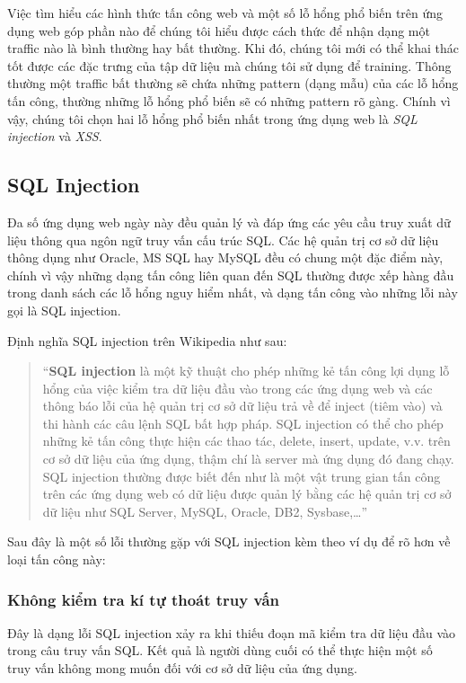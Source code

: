 \documentclass[../main-report.tex]{subfiles}
\begin{document}
Việc tìm hiểu các hình thức tấn công web và một số lỗ hổng phổ biến trên ứng dụng web góp phần nào để chúng tôi hiểu được cách thức để nhận dạng một traffic nào là bình thường hay bất thường. Khi đó, chúng tôi mới có thể khai thác tốt được các đặc trưng của tập dữ liệu mà chúng tôi sử dụng để training. Thông thường một traffic bất thường sẽ chứa những pattern (dạng mẫu) của các lỗ hổng tấn công, thường những lỗ hổng phổ biến sẽ có những pattern rõ gàng. Chính vì vậy, chúng tôi chọn hai lỗ hổng phổ biến nhất trong ứng dụng web là \emph{SQL injection} và \emph{XSS}.
\subsection{SQL Injection}
Đa số ứng dụng web ngày này đều quản lý và đáp ứng các yêu cầu truy xuất dữ liệu
thông qua ngôn ngữ truy vấn cấu trúc SQL. Các hệ quản trị cơ sở dữ liệu thông dụng
như Oracle, MS SQL hay MySQL đều có chung một đặc điểm này, chính vì vậy những
dạng tấn công liên quan đến SQL thường được xếp hàng đầu trong danh sách các lỗ hổng nguy hiểm nhất, và dạng tấn công vào những lỗi này gọi là SQL injection.

Định nghĩa SQL injection trên Wikipedia như sau:

\begin{quote}
``\textbf{SQL injection} là một kỹ thuật cho phép những kẻ tấn công lợi dụng lỗ hổng của việc kiểm tra dữ liệu đầu vào trong các ứng dụng web và các thông báo lỗi của hệ quản trị cơ sở dữ liệu trả về để inject (tiêm vào) và thi hành các câu lệnh SQL bất hợp pháp. SQL injection có thể cho phép những kẻ tấn công thực hiện các thao tác, delete, insert, update, v.v. trên cơ sở dữ liệu của ứng dụng, thậm chí là server mà ứng dụng đó đang chạy. SQL injection thường được biết đến như là một vật trung gian tấn công trên các ứng dụng web có dữ liệu được quản lý bằng các hệ quản trị cơ sở dữ liệu như SQL Server, MySQL, Oracle, DB2, Sysbase,\ldots'' \citep{wiki:sqlinj}
\end{quote}

Sau đây là một số lỗi thường gặp với SQL injection kèm theo ví dụ để rõ hơn về loại tấn công này:

\subsubsection*{Không kiểm tra kí tự thoát truy vấn}
Đây là dạng lỗi SQL injection xảy ra khi thiếu đoạn mã kiểm tra dữ liệu đầu vào trong câu truy vấn SQL. Kết quả là người dùng cuối có thể thực hiện một số truy vấn không mong muốn đối với cơ sở dữ liệu của ứng dụng.
\end{document}
